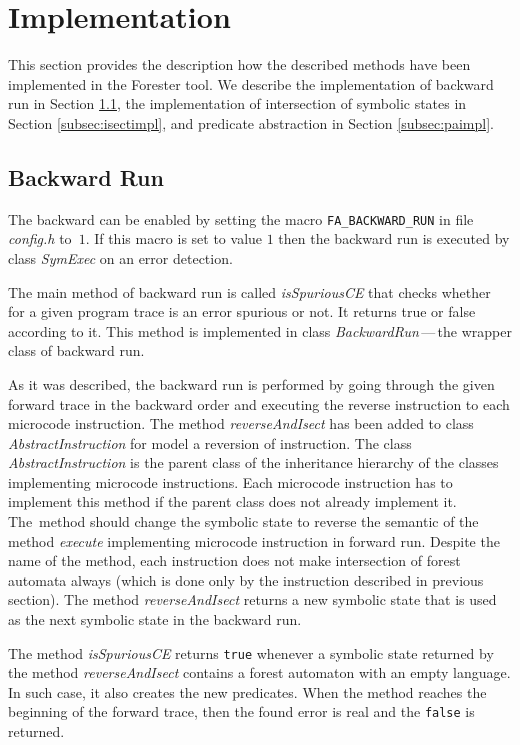 \section{Implementation}
\label{sec:impl}

This section provides the description how the described methods have been implemented
in the Forester tool.
We describe the implementation of backward run in Section \ref{subsec:bwimpl},
the implementation of intersection of symbolic states in Section \ref{subsec:isectimpl}, and
predicate abstraction in Section \ref{subsec:paimpl}.

\subsection{Backward Run}
\label{subsec:bwimpl}

The backward can be enabled by setting the macro {\tt FA\_BACKWARD\_RUN}
in file \emph{config.h} to~$1$.
If this macro is set to value $1$ then the backward run is executed
by class \emph{SymExec} on an error detection.

The main method of backward run is called \emph{isSpuriousCE} that
checks whether for a given program trace is an error
spurious or not.
It returns true or false according to it.
This method is implemented in class \emph{BackwardRun}\,---\,the wrapper
class of backward run.

As it was described, the backward run is performed by going through the given
forward trace in the backward order and executing the reverse instruction to each
microcode instruction.
The method \emph{reverseAndIsect} has been added to class \emph{AbstractInstruction}
for model a reversion of instruction.
The class \emph{AbstractInstruction} is the parent class of the inheritance hierarchy of
the classes implementing microcode instructions.
Each microcode instruction has to implement this method if the parent class does not
already implement it.
The~method should change the symbolic state to reverse the semantic of
the method \emph{execute} implementing microcode instruction in forward run.
Despite the name of the method, each instruction does not make
intersection of forest automata always (which is done only by the instruction described in
previous section).
The method \emph{reverseAndIsect} returns a new symbolic state that
is used as the next symbolic state in the backward run.

The method \emph{isSpuriousCE} returns {\tt true} whenever
a symbolic state returned by the method \emph{reverseAndIsect}
contains a forest automaton with an empty language.
In such case, it also creates the new predicates.
When the method reaches the beginning of the forward
trace, then the found error is real and the {\tt false}
is returned.

